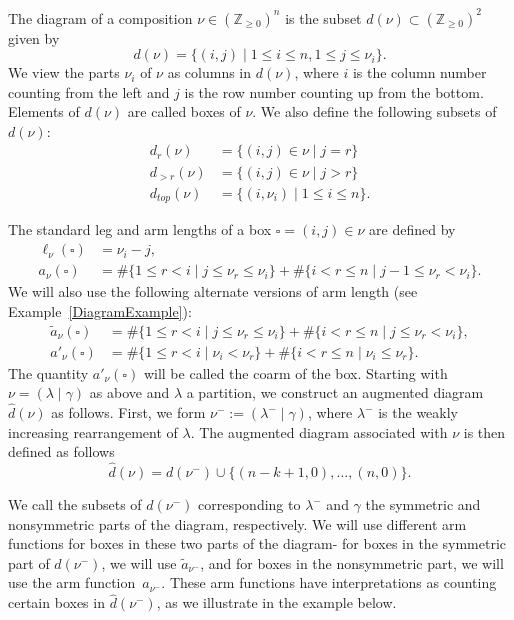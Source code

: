 \documentclass[11pt]{article}
\theoremstyle{definition}
\numberwithin{equation}{section}
\newcommand{\Z}{\mathbb{Z}}
\newcommand{\leg}[1]{{\ell_{#1}(\square)}}
\newcommand{\armonenu}{{\widetilde{a}_\nu(\square)}}
\newcommand{\armtwonu}{{a_\nu(\square)}}
\newcommand{\dg}{d}
\newcommand{\dga}{\widehat{\dg}}
\begin{document}
The diagram of a composition $\nu\in(\Z_{\ge 0})^n$ is the subset $\dg(\nu)\subset (\Z_{\ge 0})^2$ given by
$$ \dg(\nu)=\{(i,j) \mid 1\le i\le n, 1\le j\le\nu_i\}. $$
We view the parts $\nu_i$ of $\nu$ as columns in $\dg(\nu)$, where $i$ is the column number counting from the left and $j$ is the row number counting up from the bottom. Elements of $\dg(\nu)$ are called boxes of $\nu$. We also define the following subsets of $\dg(\nu)$:
\begin{align*} 
\dg_r(\nu) &= \{(i,j) \in \nu \mid j=r \} \\
\dg_{>r}(\nu) &= \{(i,j) \in \nu \mid j>r\} \\
\dg_{top}(\nu) &= \{(i,\nu_i) \mid 1 \leq i \leq n\}.
\end{align*}




The standard leg and arm lengths of a box $\square=(i,j)\in\nu$ are defined by
\begin{align*}
\leg{\nu} &= \nu_i -j,\\
\armtwonu &= \# \{ 1 \leq r < i \mid j\leq \nu_r \leq \nu_i\} + \# \{ i<r \leq n \mid j-1\leq \nu_r < \nu_i\}.
\end{align*}
We will also use the following alternate versions of arm length (see Example~\ref{DiagramExample}):
\begin{align*}
\armonenu &= \# \{1\leq r < i \mid j \leq \nu_r \leq \nu_i \} + \# \{i<r \leq n \mid j \leq \nu_r < \nu_i \}, \\
a'_\nu(\square) &= \# \{1\leq r<i \mid \nu_i < \nu_r \} + \# \{i<r \leq n \mid \nu_i \leq \nu_r \}.\end{align*}
The quantity $a'_\nu(\square)$ will be called the coarm of the box. Starting with $\nu=(\lambda \mid \gamma)$ as above and $\lambda$ a partition, we construct an augmented diagram $\dga(\nu)$ as follows. First, we form $\nu^- := (\lambda^- \mid \gamma)$, where $\lambda^-$ is the weakly increasing rearrangement of $\lambda$. The augmented diagram associated with $\nu$ is then defined as follows
\[ \dga(\nu)=\dg(\nu^-)\cup \{(n-k+1,0),\dotsc,(n,0)\}. \]

We call the subsets of $\dg(\nu^-)$ corresponding to $\lambda^-$ and $\gamma$ the symmetric and nonsymmetric parts of the diagram, respectively. We will use different arm functions for boxes in these two parts of the diagram- for boxes in the symmetric part of $\dg(\nu^-)$, we will use $\widetilde{a}_{\nu^-}$, and for boxes in the nonsymmetric part, we will use the arm function~$a_{\nu^-}$. These arm functions have interpretations as counting certain boxes in $\dga(\nu^-)$, as we illustrate in the example below. 
\end{document}
